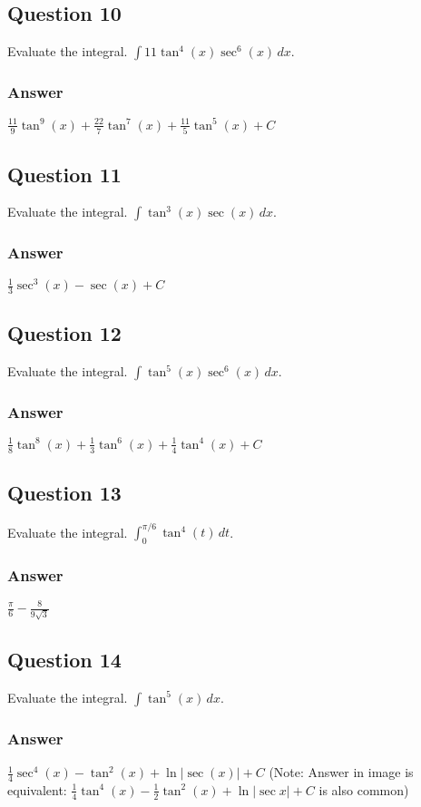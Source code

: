 \documentclass{article}
\begin{document}
\subsection*{Question 10}
Evaluate the integral. $\int 11\tan^4(x)\sec^6(x) \,dx$.
\subsubsection*{Answer}
$ \frac{11}{9}\tan^9(x) + \frac{22}{7}\tan^7(x) + \frac{11}{5}\tan^5(x) + C $

\subsection*{Question 11}
Evaluate the integral. $\int \tan^3(x)\sec(x) \,dx$.
\subsubsection*{Answer}
$ \frac{1}{3}\sec^3(x) - \sec(x) + C $

\subsection*{Question 12}
Evaluate the integral. $\int \tan^5(x)\sec^6(x) \,dx$.
\subsubsection*{Answer}
$ \frac{1}{8}\tan^8(x) + \frac{1}{3}\tan^6(x) + \frac{1}{4}\tan^4(x) + C $

\subsection*{Question 13}
Evaluate the integral. $\int_0^{\pi/6} \tan^4(t) \,dt$.
\subsubsection*{Answer}
$ \frac{\pi}{6} - \frac{8}{9\sqrt{3}} $

\subsection*{Question 14}
Evaluate the integral. $\int \tan^5(x) \,dx$.
\subsubsection*{Answer}
$ \frac{1}{4}\sec^4(x) - \tan^2(x) + \ln|\sec(x)| + C $ (Note: Answer in image is equivalent: $\frac{1}{4}\tan^4(x) - \frac{1}{2}\tan^2(x) + \ln|\sec x| + C$ is also common)
\end{document}
